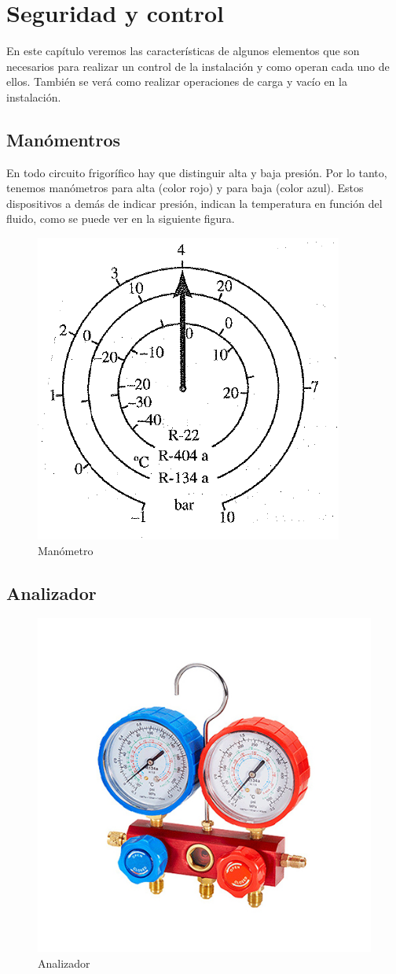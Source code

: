 \section{Seguridad y control}

En este cap\'itulo veremos las caracter\'isticas de algunos elementos que son necesarios para realizar un control de la instalaci\'on y como operan cada uno de ellos. Tambi\'en se ver\'a como realizar operaciones de carga y vac\'io en la instalaci\'on.

\subsection{Man\'omentros}

En todo circuito frigor\'ifico hay que distinguir alta y baja presi\'on. Por lo tanto, tenemos man\'ometros para alta (color rojo) y para baja (color azul). Estos dispositivos a dem\'as de indicar presi\'on, indican la temperatura en funci\'on del fluido, como se puede ver en la siguiente figura.

\begin{figure}[H]
    \centering
    \includegraphics[width=.45\linewidth]{figuras/control-seguridad/manometro.png}
    \caption{Man\'ometro}
    \label{fig:manometro}
\end{figure}

\subsection{Analizador}  

\begin{figure}
    \centering
    \includegraphics[width=.6\linewidth]{figuras/control-seguridad/analizador.jpg}
    \caption{Analizador}
    \label{fig:analizador}
\end{figure} 

